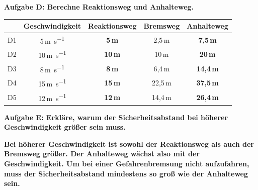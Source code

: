 \documentclass[11pt,a4paper]{article}
\newcommand{\aufgabe}[1]{\noindent\textbf{\textcolor{fachfarbe}{#1}}}
\newcommand{\lsg}[1]{\textcolor{loesung}{\textbf{#1}}}
\begin{document}
\vspace{0.4em}

\aufgabe{Aufgabe D: Berechne Reaktionsweg und Anhalteweg.}

\vspace{0.2em}
{\small
\begin{tabular}{|c|c|c|c|c|}
\hline
& \textbf{Geschwindigkeit} & \textbf{Reaktionsweg} & \textbf{Bremsweg} & \textbf{Anhalteweg} \\
\hline
D1 & 5\,\si{\metre\per\second} & \lsg{5\,m} & 2,5\,m & \lsg{7,5\,m} \\
\hline
D2 & 10\,\si{\metre\per\second} & \lsg{10\,m} & 10\,m & \lsg{20\,m} \\
\hline
D3 & 8\,\si{\metre\per\second} & \lsg{8\,m} & 6,4\,m & \lsg{14,4\,m} \\
\hline
D4 & 15\,\si{\metre\per\second} & \lsg{15\,m} & 22,5\,m & \lsg{37,5\,m} \\
\hline
D5 & 12\,\si{\metre\per\second} & \lsg{12\,m} & 14,4\,m & \lsg{26,4\,m} \\
\hline
\end{tabular}
}

\vspace{0.6em}

\aufgabe{Aufgabe E: Erkläre, warum der Sicherheitsabstand bei höherer Geschwindigkeit größer sein muss.}

\vspace{0.3em}
\lsg{Bei höherer Geschwindigkeit ist sowohl der Reaktionsweg als auch der Bremsweg größer. Der Anhalteweg wächst also mit der Geschwindigkeit. Um bei einer Gefahrenbremsung nicht aufzufahren, muss der Sicherheitsabstand mindestens so groß wie der Anhalteweg sein.}
\end{document}
